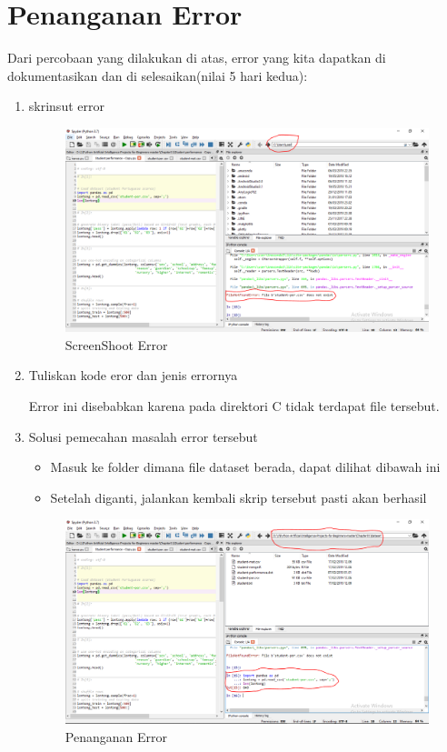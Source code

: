 \section{Penanganan Error}
Dari percobaan yang dilakukan di atas, error yang kita dapatkan di dokumentasikan dan di selesaikan(nilai 5 hari kedua):

\begin{enumerate}
	\item
skrinsut error
\begin{figure}[ht]
\centering
\includegraphics[scale=0.3]{figures/lontong/13.png}
\caption{ScreenShoot Error}
\end{figure}
	\item
Tuliskan kode eror dan jenis errornya
\par
Error ini disebabkan karena pada direktori C tidak terdapat file tersebut. 
	\item
Solusi pemecahan masalah error tersebut
\begin{itemize}
\item 	Masuk ke folder dimana file dataset berada, dapat dilihat dibawah ini
\item 	Setelah diganti, jalankan kembali skrip tersebut pasti akan berhasil
\end{itemize}
\begin{figure}[ht]
\centering
\includegraphics[scale=0.3]{figures/lontong/14.png}
\caption{Penanganan Error}
\end{figure}

\end{enumerate}

